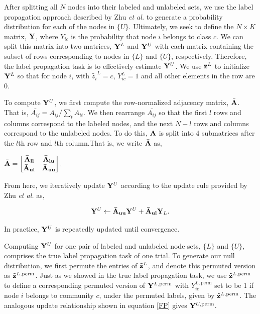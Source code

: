 \indent After splitting all $N$ nodes into their labeled and unlabeled sets, we use the label propagation approach described by Zhu \emph{et al.} \cite{learning2} to generate a probability distribution for each of the nodes in $\{U\}$. Ultimately, we seek to define the $N \times K$ matrix, ${\bf Y}$, where $Y_{ic}$ is the probability that node $i$ belongs to class $c$. We can split this matrix into two matrices, ${\bf Y}^{L}$ and ${\bf Y}^{U}$ with each matrix containing the subset of rows corresponding to nodes in $\{L\}$ and $\{U\}$, respectively. Therefore, the label propagation task is to effectively estimate ${\bf Y}^{U}$. We use $\tilde{{\bf z}}^{L}$ to initialize ${\bf Y}^{L}$ so that for node $i$, with $\tilde{{z}_{i}}^{L}=c$, $Y^{L}_{ic}=1$ and all other elements in the row are 0.   

 To compute ${\bf Y}^{U}$, we first compute the row-normalized adjacency matrix, ${\bar{\bf A}}$. That is, $\bar{A_{ij}}=A_{ij}/\sum_{t}A_{it}$. We then rearrange $\bar{A_{ij}}$ so that the first $l$ rows and columns correspond to the labeled nodes, and the next $N-l$ rows and columns correspond to the unlabeled nodes. To do this, ${\bf A}$ is split into 4 submatrices after the $l$th row and $l$th column.That is, we write ${\bar{\bf A}}$ as,
 
${\bar{\bf A}}=
\begin{bmatrix}
 {\bf \bar{A}_{ll}} & {\bf \bar{A}_{lu}} \\
 {\bf \bar{A}_{ul}} & {\bf \bar{A}_{uu}} \\
 \end{bmatrix}$.
 
 From here, we iteratively update ${\bf Y}^{U}$ according to the update rule provided by Zhu \emph{et al.} \cite{learning2} as,
 
 \begin{equation}
 \label{FP}
 {\bf Y}^{U} \leftarrow {\bf {\bar A}_{uu}}{\bf Y}^{U}+{\bf {\bar A}_{ul}}{\bf Y}_{L}.
 \end{equation}
 
 In practice, ${\bf Y}^{U}$ is repeatedly updated until convergence. 
 
Computing ${\bf Y}^{U}$ for one pair of labeled and unlabeled node sets, $\{L\}$ and $\{U\}$, comprises the true label propagation task of one trial. To generate our null distribution, we first permute the entries of $\tilde{{\bf z}}^{L}$, and denote this permuted version as $\tilde{{\bf z}}^{L,\text{perm}}$. Just as we showed in the true label propagation task, we use $\tilde{{\bf z}}^{L,\text{perm}}$ to define a corresponding permuted version of ${\bf Y}^{L,\text{perm}}$ with $Y^{L,\text{perm}}_{ic}$ set to be 1 if node $i$ belongs to community $c$, under the permuted labels, given by $\tilde{{\bf z}}^{L,\text{perm}}$. The analogous update relationship shown in equation \ref{FP} gives ${\bf Y}^{U,\text{perm}}$. 
 
